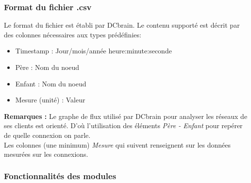 			\subsubsection{Format du fichier .csv}
				Le format du fichier est établi par DCbrain. Le contenu supporté est décrit par des colonnes nécessaires aux types prédéfinies:\\
				\begin{itemize}
				\item Timestamp : Jour/mois/année	heure:minute:seconde
				\item Père : Nom du noeud
				\item Enfant : Nom du noeud
				\item Mesure (unité) : Valeur
				\end{itemize}
				\textbf{Remarques :} Le graphe de flux utilisé par DCbrain pour analyser les réseaux de ses clients est orienté. D'où l'utilisation des éléments \textit{Père - Enfant} pour repérer de quelle connexion on parle.\\
				Les colonnes (une minimum) \textit{Mesure} qui suivent renseignent sur les données mesurées sur les connexions.
				
			\subsubsection{Fonctionnalités des modules}
			
